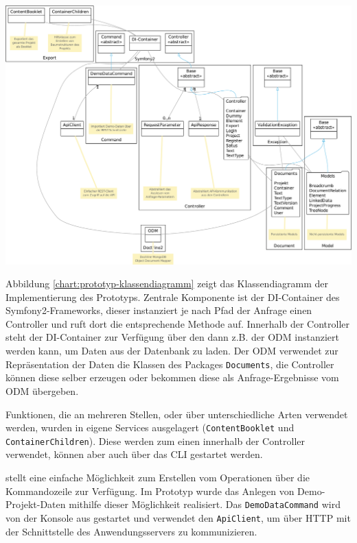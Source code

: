 \begin{center}
\includegraphics[width=\textwidth]{media/prototyp-klassendiagramm.pdf}
\label{chart:prototyp-klassendiagramm}
\end{center}

Abbildung \ref{chart:prototyp-klassendiagramm} zeigt das Klassendiagramm der Implementierung des Prototyps. Zentrale Komponente ist der DI-Container des Symfony2-Frameworks, dieser instanziert je nach Pfad der Anfrage einen Controller und ruft dort die entsprechende Methode auf. Innerhalb der Controller steht der DI-Container zur Verfügung über den dann z.B. der ODM instanziert werden kann, um Daten aus der Datenbank zu laden. Der ODM verwendet zur Repräsentation der Daten die Klassen des Packages \texttt{Documents}, die Controller können diese selber erzeugen oder bekommen diese als Anfrage-Ergebnisse vom ODM übergeben.

Funktionen, die an mehreren Stellen, oder über unterschiedliche Arten verwendet werden, wurden in eigene Services ausgelagert (\texttt{ContentBooklet} und \texttt{ContainerChildren}). Diese werden zum einen innerhalb der Controller verwendet, können aber auch über das CLI gestartet werden. 

 stellt eine einfache Möglichkeit zum Erstellen vom Operationen über die Kommandozeile zur Verfügung. Im Prototyp wurde das Anlegen von Demo-Projekt-Daten mithilfe dieser Möglichkeit realisiert. Das \texttt{DemoDataCommand} wird von der Konsole aus gestartet und verwendet den \texttt{ApiClient}, um über HTTP mit der Schnittstelle des Anwendungsservers zu kommunizieren.

